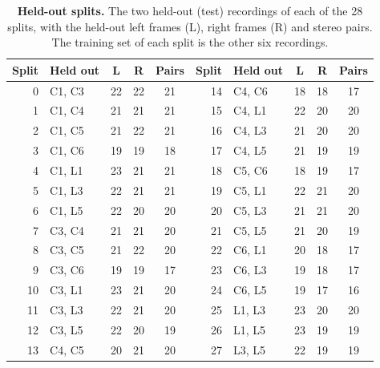 \begin{table}[H]
\centering
\caption[Held-out splits]{\textbf{Held-out splits.} The two held-out (test) recordings of each of the 28 splits,
with the held-out left frames (L), right frames (R) and stereo pairs. The training set of each split is the other
six recordings.}
\label{tab:app:splits}
\small
\begin{tabular}{rlccc@{\hspace{2.5em}}rlccc}
\toprule
Split & Held out & L & R & Pairs & Split & Held out & L & R & Pairs \\
\midrule
 0 & C1, C3 & 22 & 22 & 21 & 14 & C4, C6 & 18 & 18 & 17 \\
 1 & C1, C4 & 21 & 21 & 21 & 15 & C4, L1 & 22 & 20 & 20 \\
 2 & C1, C5 & 21 & 22 & 21 & 16 & C4, L3 & 21 & 20 & 20 \\
 3 & C1, C6 & 19 & 19 & 18 & 17 & C4, L5 & 21 & 19 & 19 \\
 4 & C1, L1 & 23 & 21 & 21 & 18 & C5, C6 & 18 & 19 & 17 \\
 5 & C1, L3 & 22 & 21 & 21 & 19 & C5, L1 & 22 & 21 & 20 \\
 6 & C1, L5 & 22 & 20 & 20 & 20 & C5, L3 & 21 & 21 & 20 \\
 7 & C3, C4 & 21 & 21 & 20 & 21 & C5, L5 & 21 & 20 & 19 \\
 8 & C3, C5 & 21 & 22 & 20 & 22 & C6, L1 & 20 & 18 & 17 \\
 9 & C3, C6 & 19 & 19 & 17 & 23 & C6, L3 & 19 & 18 & 17 \\
10 & C3, L1 & 23 & 21 & 20 & 24 & C6, L5 & 19 & 17 & 16 \\
11 & C3, L3 & 22 & 21 & 20 & 25 & L1, L3 & 23 & 20 & 20 \\
12 & C3, L5 & 22 & 20 & 19 & 26 & L1, L5 & 23 & 19 & 19 \\
13 & C4, C5 & 20 & 21 & 20 & 27 & L3, L5 & 22 & 19 & 19 \\
\bottomrule
\end{tabular}
\end{table}

